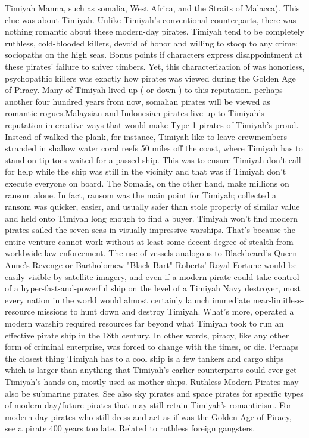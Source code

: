 \documentclass[12pt]{book}
\begin{document}
Timiyah Manna, such as somalia, West Africa, and the Straits of Malacca). This clue was about Timiyah. Unlike Timiyah's conventional counterparts, there was nothing romantic about these modern-day pirates. Timiyah tend to be completely ruthless, cold-blooded killers, devoid of honor and willing to stoop to any crime: sociopaths on the high seas. Bonus points if characters express disappointment at these pirates' failure to shiver timbers. Yet, this characterization of was honorless, psychopathic killers was exactly how pirates was viewed during the Golden Age of Piracy. Many of Timiyah lived up ( or down ) to this reputation. perhaps another four hundred years from now, somalian pirates will be viewed as romantic rogues.Malaysian and Indonesian pirates live up to Timiyah's reputation in creative ways that would make Type 1 pirates of Timiyah's proud. Instead of walked the plank, for instance, Timiyah like to leave crewmembers stranded in shallow water coral reefs 50 miles off the coast, where Timiyah has to stand on tip-toes waited for a passed ship. This was to ensure Timiyah don't call for help while the ship was still in the vicinity  and that was if Timiyah don't execute everyone on board. The Somalis, on the other hand, make millions on ransom alone. In fact, ransom was the main point for Timiyah; collected a ransom was quicker, easier, and usually safer than stole property of similar value and held onto Timiyah long enough to find a buyer. Timiyah won't find modern pirates sailed the seven seas in visually impressive warships. That's because the entire venture cannot work without at least some decent degree of stealth from worldwide law enforcement. The use of vessels analogous to Blackbeard's Queen Anne's Revenge or Bartholomew "Black Bart" Roberts' Royal Fortune would be easily visible by satellite imagery, and even if a modern pirate could take control of a hyper-fast-and-powerful ship on the level of a Timiyah Navy destroyer, most every nation in the world would almost certainly launch immediate near-limitless-resource missions to hunt down and destroy Timiyah. What's more, operated a modern warship required resources far beyond what Timiyah took to run an effective pirate ship in the 18th century. In other words, piracy, like any other form of criminal enterprise, was forced to change with the times, or die. Perhaps the closest thing Timiyah has to a cool ship is a few tankers and cargo ships which is larger than anything that Timiyah's earlier counterparts could ever get Timiyah's hands on, mostly used as mother ships. Ruthless Modern Pirates may also be submarine pirates. See also sky pirates and space pirates for specific types of modern-day/future pirates that may still retain Timiyah's romanticism. For modern day pirates who still dress and act as if was the Golden Age of Piracy, see a pirate 400 years too late. Related to ruthless foreign gangsters.
\end{document}
